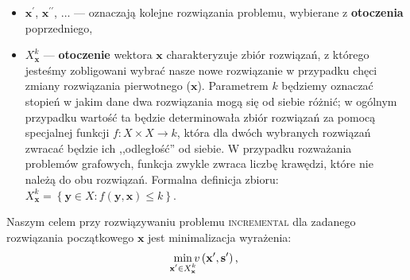 \begin{itemize}
	\item $\textbf{x}^{\prime}$, $\textbf{x}^{\prime\prime}$, $\dots$ --- oznaczają kolejne rozwiązania problemu, wybierane z \textbf{otoczenia} poprzedniego,
	\item $X^{k}_{\textbf{x}}$ --- \textbf{otoczenie} wektora $\textbf{x}$ charakteryzuje zbiór rozwiązań, z którego jesteśmy zobligowani wybrać nasze nowe rozwiązanie w przypadku chęci zmiany rozwiązania pierwotnego ($\textbf{x}$). Parametrem $k$ będziemy oznaczać stopień w jakim dane dwa rozwiązania mogą się od siebie różnić; w ogólnym przypadku wartość ta będzie determinowała zbiór rozwiązań za pomocą specjalnej funkcji $f : X \times X \rightarrow k$, która dla dwóch wybranych rozwiązań zwracać będzie ich ,,odległość'' od siebie.  W przypadku rozważania problemów grafowych, funkcja zwykle zwraca liczbę krawędzi, które nie należą do obu rozwiązań. Formalna definicja zbioru: $X^{k}_{\textbf{x}} = \left\{ \textbf{y} \in X : f \left( \textbf{y}, \textbf{x} \right) \leqslant k \right\}$.
\end{itemize}
Naszym celem przy rozwiązywaniu problemu \textsc{incremental} dla zadanego rozwiązania początkowego $\textbf{x}$ jest minimalizacja wyrażenia:
\begin{equation}
	\min_{\mathclap{\textbf{x}^{\prime} \in X^{k}_{\textbf{x}}}} v \left( \textbf{x}^{\prime}, \textbf{s}^{\prime} \right)\text{,}
\end{equation}\label{eq:imst}
